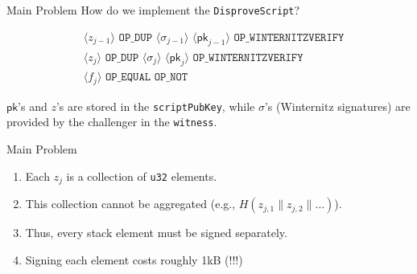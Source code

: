 \documentclass{zkdl-presentation-template}
\newcommand{\elem}[1]{\, \langle #1 \rangle \,}
\newcommand{\opcode}[1]{\, \texttt{#1} \,}
\begin{document}
     \begin{frame}{Main Problem}
        How do we implement the \texttt{DisproveScript}?

        \begin{empheqboxed}
          \begin{align*}
            &\elem{z_{j-1}} \opcode{OP\_DUP} \elem{\sigma_{j-1}}
            \elem{\mathsf{pk}_{j-1}} \opcode{OP\_WINTERNITZVERIFY} \\
            &\elem{z_{j}} \opcode{OP\_DUP} \elem{\sigma_{j}}
            \elem{\mathsf{pk}_{j}} \opcode{OP\_WINTERNITZVERIFY} \\
            &\elem{f_j} \opcode{OP\_EQUAL} \opcode{OP\_NOT}
          \end{align*}
        \end{empheqboxed}

        $\mathsf{pk}$'s and $z$'s are stored in the \texttt{scriptPubKey}, while $\sigma$'s (Winternitz signatures) are provided by the challenger in the \texttt{witness}.

        \begin{alertblock}{Main Problem}
            \begin{enumerate}
                \item Each $z_j$ is a collection of \texttt{u32} elements.
                \item This collection cannot be aggregated (e.g., $H(z_{j,1} \parallel z_{j,2} \parallel \dots )$).
                \item Thus, every stack element must be signed separately.
                \item Signing each element costs roughly 1kB \textcolor{red!70!black}{(!!!)}
            \end{enumerate}
        \end{alertblock}
    \end{frame}
    
\end{document}
